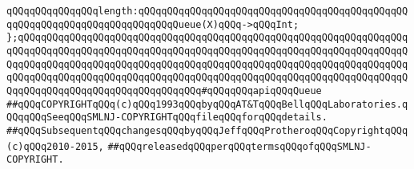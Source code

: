 \newline
\verb|qQQqqQQqqQQqqQQqlength:qQQqqQQqqQQqqQQqqQQqqQQqqQQqqQQqqQQqqQQqqQQqqQQqqQQqqQQqqQQqqQQqqQQqqQQqqQQqQueue(X)qQQq->qQQqInt;|\newline
\verb|};qQQqqQQqqQQqqQQqqQQqqQQqqQQqqQQqqQQqqQQqqQQqqQQqqQQqqQQqqQQqqQQqqQQqqQQqqQQqqQQqqQQqqQQqqQQqqQQqqQQqqQQqqQQqqQQqqQQqqQQqqQQqqQQqqQQqqQQqqQQqqQQqqQQqqQQqqQQqqQQqqQQqqQQqqQQqqQQqqQQqqQQqqQQqqQQqqQQqqQQqqQQqqQQqqQQqqQQqqQQqqQQqqQQqqQQqqQQqqQQqqQQqqQQqqQQqqQQqqQQqqQQqqQQqqQQqqQQqqQQqqQQqqQQqqQQqqQQqqQQqqQQqqQQqqQQq#qQQqqQQqapiqQQqQueue|\newline
\newline
\newline
\verb|##qQQqCOPYRIGHTqQQq(c)qQQq1993qQQqbyqQQqAT&TqQQqBellqQQqLaboratories.qQQqqQQqSeeqQQqSMLNJ-COPYRIGHTqQQqfileqQQqforqQQqdetails.|\newline
\verb|##qQQqSubsequentqQQqchangesqQQqbyqQQqJeffqQQqProtheroqQQqCopyrightqQQq(c)qQQq2010-2015,|\newline
\verb|##qQQqreleasedqQQqperqQQqtermsqQQqofqQQqSMLNJ-COPYRIGHT.|\newline

